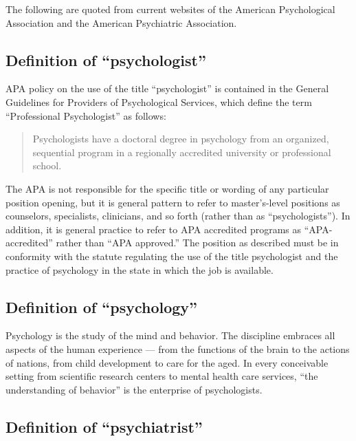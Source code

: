 \begin{refsection}
The following are quoted from current websites of the American Psychological Association and the American Psychiatric Association.

\subsection{Definition of ``psychologist''}
\label{definitionofpsychologist}

APA policy on the use of the title ``psychologist'' is contained in the General Guidelines for Providers of Psychological Services, which define the term ``Professional Psychologist'' as follows:

\begin{quote}

Psychologists have a doctoral degree in psychology from an organized, sequential program in a regionally accredited university or professional school.
\end{quote}

The APA is not responsible for the specific title or wording of any particular position opening, but it is general pattern to refer to master's-level positions as counselors, specialists, clinicians, and so forth (rather than as ``psychologists''). In addition, it is general practice to refer to APA accredited programs as ``APA-accredited'' rather than ``APA approved.'' The position as described must be in conformity with the statute regulating the use of the title psychologist and the practice of psychology in the state in which the job is available.

\subsection{Definition of ``psychology''}
\label{definitionofpsychology}

Psychology is the study of the mind and behavior. The discipline embraces all aspects of the human experience --- from the functions of the brain to the actions of nations, from child development to care for the aged. In every conceivable setting from scientific research centers to mental health care services, ``the understanding of behavior'' is the enterprise of psychologists.

\subsection{Definition of ``psychiatrist''}
\label{definitionofpsychiatrist}


\end{refsection}
